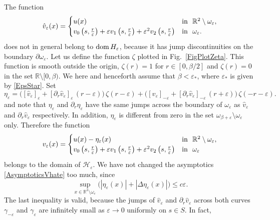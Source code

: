 \documentclass[reqno]{amsart}
\theoremstyle{plain}
\numberwithin{equation}{section}
\newcommand{\dom}{\mathop{\rm dom}}
\newcommand{\Real}{\mathbb R}
\newcommand{\eps}{\varepsilon}
\newcommand{\cH}{\mathcal{H}}
\renewcommand{\leq}{\leqslant}
\newcommand\nep{\textstyle\frac r\eps}
\begin{document}
The function
\begin{equation}\label{AsymptoticsVhate}
 \hat{v}_\eps(x)=
\begin{cases}
  u(x)& \hbox{in \ }\Real^2\setminus \omega_\eps, \\
    v_0\left(s,\nep\right)+\eps v_1\left(s,\nep\right)+\eps^2 v_2\left(s,\nep\right)
&\hbox{in \ } \omega_\eps.
\end{cases}
\end{equation}
does not in general belong to $\dom H_\eps$, because it  has  jump discontinuities on the boundary $\partial\omega_\eps$.
Let us define the function $\zeta$ plotted in Fig.~\ref{FigPlotZeta}. This function is smooth outside the origin,  $\zeta(r)=1$ for $r\in [0,\beta/2]$ and $\zeta(r)=0$ in the set $\Real\setminus [0,\beta)$.
We here and henceforth assume that $\beta<\eps_*$, where $\eps_*$ is given by \eqref{EpsStar}. Set
\begin{equation*}
  \eta_\eps=\big([\hat{v}_\eps]_{\eps}+[\partial_r\hat{v}_\eps]_{\eps}\,
  (r-\eps)\big)\,\zeta(r-\eps)
  +\big([\hat{v}_\eps]_{-\eps}+[\partial_r\hat{v}_\eps]_{-\eps}\,(r+\eps)\big)
  \,\zeta(-r-\eps).
\end{equation*}
and note that $\eta_\eps$ and $\partial_r\eta_\eps$ have the same jumps across the boundary of $\omega_\eps$ as $\hat{v}_\eps$ and $\partial_r\hat{v}_\eps$ respectively. In addition, $\eta_\eps$ is different from zero in the set $\omega_{\beta+\eps}\setminus\omega_\eps$ only. Therefore the function
\begin{equation}\label{AsymptoticsVe}
 v_\eps(x)=
\begin{cases}
  u(x)-\eta_\eps(x)& \hbox{in \ }\Real^2\setminus \omega_\eps, \\
    v_0\left(s,\nep\right)+\eps v_1\left(s,\nep\right)+\eps^2 v_2\left(s,\nep\right)
&\hbox{in \ } \omega_\eps
\end{cases}
\end{equation}
belongs to the domain of $\cH_\eps$.
We have not changed the asymptotics \eqref{AsymptoticsVhate} too much, since
\begin{equation}\label{EtaEpsEstimate}
  \sup_{x\in \Real^2\setminus \omega_\eps}\big(|\eta_\eps(x)|+|\Delta\eta_\eps(x)|\big)\leq c\eps.
\end{equation}
The last inequality is valid,  because  the jumps of $\hat{v}_\eps$ and $\partial_r\hat{v}_\eps$ across both curves $\gamma_{-\eps}$ and $\gamma_{\eps}$ are infinitely small as $\eps\to 0$ uniformly on $s\in S$. In fact,
\end{document}
